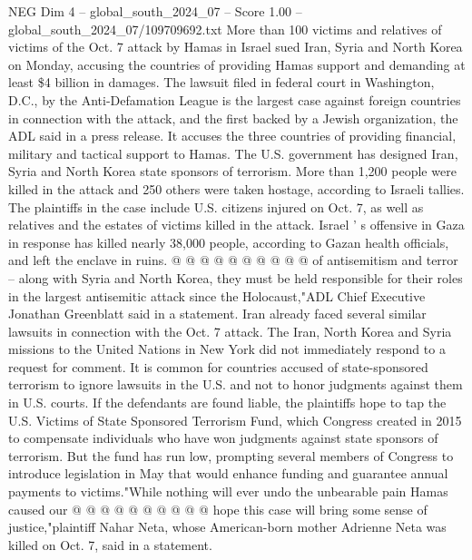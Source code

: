 \begin{textsample}{NEG Dim 4 – global\_south\_2024\_07 – Score 1.00 – global\_south\_2024\_07/109709692.txt}  \label{ex:f4_neg_344}
More than 100 victims and relatives of victims of the Oct. 7 attack by Hamas in Israel sued Iran, Syria and North Korea on Monday, accusing the countries of providing Hamas support and demanding at least \$4 billion in damages.
The lawsuit filed in federal court in Washington, D.C., by the Anti-Defamation League is the largest case against foreign countries in connection with the attack, and the first backed by a Jewish organization, the ADL said in a press release.
It accuses the three countries of providing financial, military and tactical support to Hamas.
The U.S. government has designed Iran, Syria and North Korea state sponsors of terrorism.
More than 1,200 people were killed in the attack and 250 others were taken hostage, according to Israeli tallies.
The plaintiffs in the case include U.S. citizens injured on Oct. 7, as well as relatives and the estates of victims killed in the attack.
Israel ' s offensive in Gaza in response has killed nearly 38,000 people, according to Gazan health officials, and left the enclave in ruins. @ @ @ @ @ @ @ @ @ @ of antisemitism and terror -- along with Syria and North Korea, they must be held responsible for their roles in the largest antisemitic attack since the Holocaust,"ADL Chief Executive Jonathan Greenblatt said in a statement.
Iran already faced several similar lawsuits in connection with the Oct. 7 attack.
The Iran, North Korea and Syria missions to the United Nations in New York did not immediately respond to a request for comment.
It is common for countries accused of state-sponsored terrorism to ignore lawsuits in the U.S. and not to honor judgments against them in U.S. courts.
If the defendants are found liable, the plaintiffs hope to tap the U.S.
Victims of State Sponsored Terrorism Fund, which Congress created in 2015 to compensate individuals who have won judgments against state sponsors of terrorism.
But the fund has run low, prompting several members of Congress to introduce legislation in May that would enhance funding and guarantee annual payments to victims."While nothing will ever undo the unbearable pain Hamas caused our @ @ @ @ @ @ @ @ @ @ hope this case will bring some sense of justice,"plaintiff Nahar Neta, whose American-born mother Adrienne Neta was killed on Oct. 7, said in a statement.

\end{textsample}
